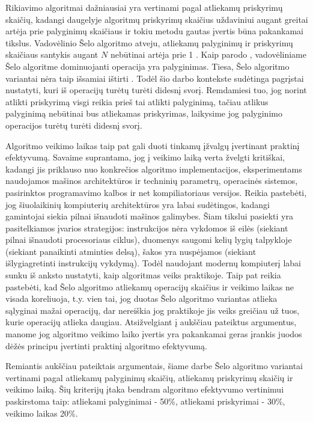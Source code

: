 \documentclass{VUMIFInfKursinis}
\begin{document}
Rikiavimo algoritmai dažniausiai yra vertinami pagal atliekamų priskyrimų skaičių, kadangi
daugelyje algoritmų priskyrimų skaičius uždaviniui augant greitai artėja prie palyginimų skaičiaus ir
tokiu metodu gautas įvertis būna pakankamai tikslus.
Vadovėlinio Šelo algoritmo atveju, atliekamų palyginimų ir priskyrimų skaičiaus santykis augant $N$ nebūtinai artėja prie 1 \cite{Radavičius_Baranauskas_2013}.
Kaip parodo \cite{ciura2001best}, vadovėliniame Šelo algoritme dominuojanti operacija yra palyginimas.
Tiesa, Šelo algoritmo variantai nėra taip išsamiai ištirti \cite{brejova2001analyzing}.
Todėl šio darbo kontekste sudėtinga pagrįstai nustatyti, kuri iš operacijų turėtų turėti didesnį svorį.
Remdamiesi tuo, jog norint atlikti priskyrimą visgi reikia prieš tai atlikti palyginimą, tačiau atlikus palyginimą nebūtinai bus atliekamas priskyrimas,
laikysime jog palyginimo operacijos turėtų turėti didesnį svorį.

Algoritmo veikimo laikas taip pat gali duoti tinkamų įžvalgų įvertinant praktinį efektyvumą.
Savaime suprantama, jog į veikimo laiką verta žvelgti kritiškai, kadangi jis priklauso nuo konkrečios algoritmo implementacijos,
eksperimentams naudojamos mašinos architektūros ir techninių parametrų, operacinės sistemos, pasirinktos programavimo kalbos ir net kompiliatoriaus versijos.
Reikia pastebėti, jog šiuolaikinių kompiuterių architektūros yra labai sudėtingos, kadangi gamintojai siekia pilnai išnaudoti mašinos galimybes.
Šiam tikslui pasiekti yra pasitelkiamos įvarios strategijos:
instrukcijos nėra vykdomos iš eilės (siekiant pilnai išnaudoti procesoriaus ciklus),
duomenys saugomi kelių lygių talpykloje (siekiant panaikinti atminties delsą),
šakos yra nuspėjamos (siekiant išlygiagretinti instrukcijų vykdymą).
Todėl naudojant modernų kompiuterį labai sunku iš anksto nustatyti, kaip algoritmas veiks praktikoje. 
Taip pat reikia pastebėti, kad Šelo algoritmo atliekamų operacijų skaičius ir veikimo laikas ne visada koreliuoja, t.y.
vien tai, jog duotas Šelo algoritmo variantas atlieka sąlyginai mažai operacijų, dar nereiškia jog praktikoje jis veiks greičiau
už tuos, kurie operacijų atlieka daugiau.
Atsižvelgiant į aukščiau pateiktus argumentus, manome jog
algoritmo veikimo laiko įvertis yra pakankamai geras įrankis juodos dėžės principu įvertinti praktinį algoritmo efektyvumą.

Remiantis aukščiau pateiktais argumentais, šiame darbe Šelo algoritmo variantai vertinami pagal
atliekamų palyginimų skaičių, atliekamų priskyrimų skaičių ir veikimo laiką.
Šių kriterijų įtaka bendram algoritmo efektyvumo vertinimui paskirstoma taip: atliekami palyginimai - 50\%, atliekami priskyrimai - 30\%, veikimo laikas 20\%.
\end{document}
